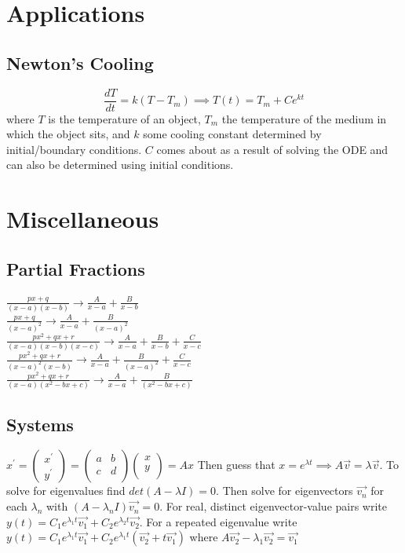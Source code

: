 \documentclass[10pt,landscape,letterpaper]{cheatsheet}
\begin{document}
\section*{Applications}
\subsection*{Newton's Cooling}
$$\frac{dT}{dt}=k(T-T_m)\implies T(t)=T_m+Ce^{kt}$$ where $T$ is the temperature of an object, $T_m$ the temperature of the medium in which the object sits, and $k$ some cooling constant determined by initial/boundary conditions.
$C$ comes about as a result of solving the ODE and can also be determined using initial conditions.
\section*{Miscellaneous}
\subsection*{Partial Fractions}
$\frac{px+q}{(x-a)(x-b)}\to\frac{A}{x-a}+\frac{B}{x-b}$\\
$\frac{px+q}{(x-a)^2}\to\frac{A}{x-a}+\frac{B}{(x-a)^2}$\\
$\frac{px^2+qx+r}{(x-a)(x-b)(x-c)}\to\frac{A}{x-a}+\frac{B}{x-b}+\frac{C}{x-c}$\\
$\frac{px^2+qx+r}{(x-a)^2(x-b)}\to\frac{A}{x-a}+\frac{B}{(x-a)^2}+\frac{C}{x-c}$\\
$\frac{px^2+qx+r}{(x-a)(x^2-bx+c)}\to\frac{A}{x-a}+\frac{B}{(x^2-bx+c)}$
\subsection*{Systems}
$x^\prime=
        \begin{pmatrix}
                x^\prime \\
                y^\prime
        \end{pmatrix}=
        \begin{pmatrix}
                a & b \\
                c & d \\
        \end{pmatrix}
        \begin{pmatrix}
                x \\
                y \\
        \end{pmatrix}=Ax$
Then guess that $x=e^{\lambda t}\implies A\vec{v}=\lambda \vec{v}$.
To solve for eigenvalues find $det\left(A-\lambda I\right)=0$.
Then solve for eigenvectors $\vec{v_n}$ for each $\lambda_n$ with $\left(A-\lambda_n I\right)\vec{v_n}=0$.
For real, distinct eigenvector-value pairs write $y(t)=C_1e^{\lambda_1 t}\vec{v_1}+C_2e^{\lambda_2 t}\vec{v_2}$.
For a repeated eigenvalue write $y(t)=C_1e^{\lambda_1 t}\vec{v_1}+C_2e^{\lambda_1 t}(\vec{v_2}+t\vec{v_1})$ where $A\vec{v_2}-\lambda_1\vec{v_2}=\vec{v_1}$
\end{document}
